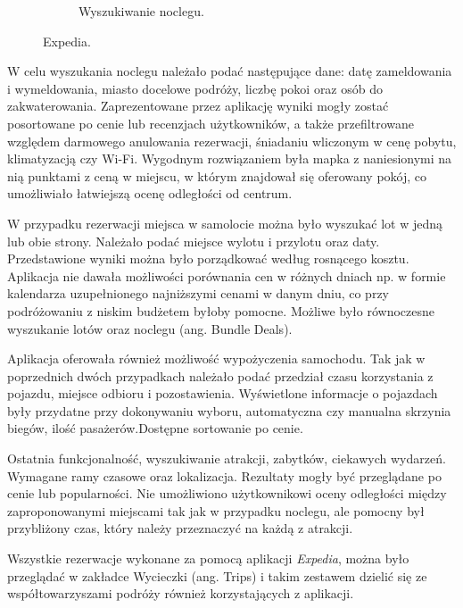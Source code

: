 \documentclass[10pt,twoside,a4paper]{report}
\begin{document}
\begin{figure}[h]
\begin{subfigure}{0.5\textwidth}
\caption{Wyszukiwanie noclegu.}
\label{fig:Esubim2}
\end{subfigure}
\caption{Expedia.}
\label{fig:Eimage}
\end{figure}
\par W celu wyszukania noclegu należało podać następujące dane: datę zameldowania i wymeldowania, miasto docelowe podróży, liczbę pokoi oraz osób do zakwaterowania. Zaprezentowane przez aplikację wyniki mogły zostać posortowane po cenie lub recenzjach użytkowników, a także przefiltrowane względem darmowego anulowania rezerwacji, śniadaniu wliczonym w cenę pobytu, klimatyzacją czy Wi-Fi. Wygodnym rozwiązaniem była mapka z naniesionymi na nią punktami z ceną w miejscu, w którym znajdował się oferowany pokój, co umożliwiało łatwiejszą ocenę odległości od centrum.
\par W przypadku rezerwacji miejsca w samolocie można było wyszukać lot w jedną lub obie strony. Należało podać miejsce wylotu i przylotu oraz daty. Przedstawione wyniki można było porządkować według rosnącego kosztu. Aplikacja nie dawała możliwości porównania cen w różnych dniach np. w formie kalendarza uzupełnionego najniższymi cenami w danym dniu, co przy podróżowaniu z niskim budżetem byłoby pomocne. Możliwe było równoczesne wyszukanie lotów oraz noclegu (ang. Bundle Deals).
\par Aplikacja oferowała również możliwość wypożyczenia samochodu. Tak jak w poprzednich dwóch przypadkach należało podać przedział czasu korzystania z pojazdu, miejsce odbioru i pozostawienia. Wyświetlone informacje o pojazdach były przydatne przy dokonywaniu wyboru, automatyczna czy manualna skrzynia biegów, ilość pasażerów.Dostępne sortowanie po cenie.
\par Ostatnia funkcjonalność, wyszukiwanie atrakcji, zabytków, ciekawych wydarzeń. Wymagane ramy czasowe oraz lokalizacja. Rezultaty mogły być przeglądane po cenie lub popularności. Nie umożliwiono użytkownikowi oceny odległości między zaproponowanymi miejscami tak jak w przypadku noclegu, ale pomocny był przybliżony czas, który należy przeznaczyć na każdą z atrakcji.
\par Wszystkie rezerwacje wykonane za pomocą aplikacji \textit{Expedia}, można było przeglądać w zakładce Wycieczki (ang. Trips) i takim zestawem dzielić się ze współtowarzyszami podróży również korzystających z aplikacji.
\end{document}

